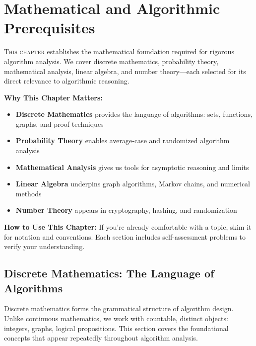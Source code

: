 \chapter{Mathematical and Algorithmic Prerequisites}
\label{ch:prerequisites}

\lettrine[lines=3, lhang=0.1, loversize=0.15]{T}{his chapter} establishes 
the mathematical foundation required for rigorous algorithm analysis. We cover 
discrete mathematics, probability theory, mathematical analysis, linear algebra, 
and number theory—each selected for its direct relevance to algorithmic reasoning.

\begin{chapterintro}
\textbf{Why This Chapter Matters:}
\begin{itemize}[noitemsep]
    \item \textbf{Discrete Mathematics} provides the language of algorithms: sets, functions, graphs, and proof techniques
    \item \textbf{Probability Theory} enables average-case and randomized algorithm analysis
    \item \textbf{Mathematical Analysis} gives us tools for asymptotic reasoning and limits
    \item \textbf{Linear Algebra} underpins graph algorithms, Markov chains, and numerical methods
    \item \textbf{Number Theory} appears in cryptography, hashing, and randomization
\end{itemize}

\textbf{How to Use This Chapter:}
If you're already comfortable with a topic, skim it for notation and conventions.
Each section includes self-assessment problems to verify your understanding.
\end{chapterintro}

\section{Discrete Mathematics: The Language of Algorithms}
\label{sec:discrete-math}

\begin{sectionintro}
Discrete mathematics forms the grammatical structure of algorithm design.
Unlike continuous mathematics, we work with countable, distinct objects:
integers, graphs, logical propositions. This section covers the foundational
concepts that appear repeatedly throughout algorithm analysis.
\end{sectionintro}

